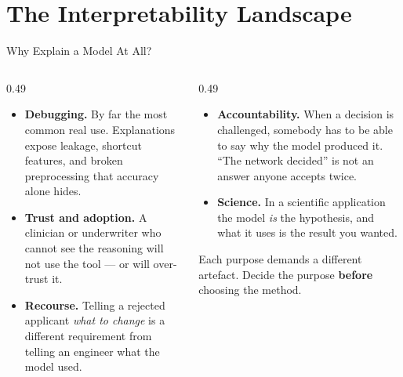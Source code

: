 \section{The Interpretability Landscape}

\begin{frame}{Why Explain a Model At All?}

    \begin{columns}[T]
        \begin{column}{0.49\textwidth}
            \begin{itemize}
                \setlength\itemsep{0.55em}
                \item \textbf{Debugging.} By far the most common real use. Explanations expose
                      leakage, shortcut features, and broken preprocessing that accuracy alone
                      hides.
                \item \textbf{Trust and adoption.} A clinician or underwriter who cannot see the
                      reasoning will not use the tool --- or will over-trust it.
                \item \textbf{Recourse.} Telling a rejected applicant \emph{what to change} is a
                      different requirement from telling an engineer what the model used.
            \end{itemize}
        \end{column}
        \begin{column}{0.49\textwidth}
            \begin{itemize}
                \setlength\itemsep{0.55em}
                \item \textbf{Accountability.} When a decision is challenged, somebody has to be
                      able to say why the model produced it. ``The network decided'' is not an
                      answer anyone accepts twice.
                \item \textbf{Science.} In a scientific application the model \emph{is} the
                      hypothesis, and what it uses is the result you wanted.
            \end{itemize}
            \vspace{0.5em}
            \begin{tcolorbox}[colback=gray!8, boxrule=0pt]
                \small Each purpose demands a different artefact. Decide the purpose \textbf{before}
                choosing the method.
            \end{tcolorbox}
        \end{column}
    \end{columns}
\end{frame}

